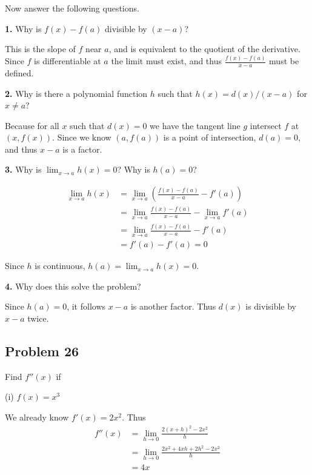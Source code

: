 Now answer the following questions.

\vs

\textbf{1.} Why is $f(x)-f(a)$ divisible by $(x-a)$?

This is the slope of $f$ near $a$, and is equivalent to the quotient
of the derivative. Since $f$ is differentiable at $a$ the limit must
exist, and thus $\frac{f(x)-f(a)}{x-a}$ must be defined.

\vs

\textbf{2.} Why is there a polynomial function $h$ such that
$h(x)=d(x)/(x-a)$ for $x\neq a$?

Because for all $x$ such that $d(x)=0$ we have the tangent line $g$
intersect $f$ at $(x, f(x))$. Since we know $(a, f(a))$ is a point of
intersection, $d(a)=0$, and thus $x-a$ is a factor.

\vs

\textbf{3.} Why is $\lim_{x\to a}h(x)=0$? Why is $h(a)=0$?

\begin{align*}
  \lim_{x\to a}h(x)&=\lim_{x\to a}\left(\frac{f(x)-f(a)}{x-a}-f'(a)\right)\\
                 &=\lim_{x\to
                   a}\frac{f(x)-f(a)}{x-a}-\lim_{x\to
                   a}f'(a)\\
                 &=\lim_{x\to a}\frac{f(x)-f(a)}{x-a}-f'(a)\\
                 &=f'(a)-f'(a)=0
\end{align*}

Since $h$ is continuous, $h(a)=\lim_{x\to a}h(x)=0$.

\vs

\textbf{4.} Why does this solve the problem?

Since $h(a)=0$, it follows $x-a$ is another factor. Thus $d(x)$ is
divisible by $x-a$ twice.

\subsection*{Problem 26}
Find $f''(x)$ if

\vs

(i) $f(x)=x^3$

We already know $f'(x)=2x^2$. Thus
\begin{align*}
  f''(x)&=\lim_{h\to0}\frac{2(x+h)^2-2x^2}{h}\\
        &=\lim_{h\to0}\frac{2x^2+4xh+2h^2-2x^2}{h}\\
        &=4x
\end{align*}

